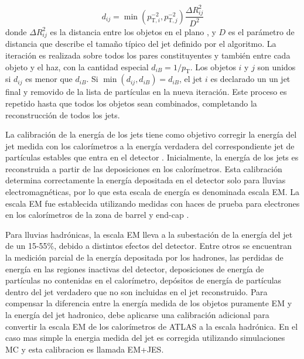 \begin{equation}
  d_{ij} = \min(p_{\mathrm{T},i}^{-2}, p_{\mathrm{T},j}^{-2}) \frac{\Delta R_{ij}^2}{D^2}
\end{equation}
%
donde $\Delta R_{ij}^2$ es la distancia entre los objetos en el plano {\etaphi},
y $D$ es el parámetro de distancia que describe el tamaño típico del jet
definido por el algoritmo. La iteración es realizada sobre todos los pares
constituyentes y también entre cada objeto y el haz, con la cantidad especial
$d_{iB} = 1/p_{\mathrm{T}}$. Los objetos $i$ y $j$ son unidos si $d_{ij}$ es
menor que $d_{iB}$.
Si $\min(d_{ij}, d_{iB}) = d_{iB}$, el jet $i$ es declarado un un jet final y
removido de la lista de partículas en la nueva iteración. Este proceso es
repetido hasta que todos los objetos sean combinados, completando la
reconstrucción de todos los jets.

La calibración de la energía de los jets tiene como objetivo corregir la energía
del jet medida con los calorímetros a la energía verdadera del correspondiente
jet de partículas estables que entra en el detector \cite{Aad:2011he}. Inicialmente, la energía de
los jets es reconstruida a partir de las deposiciones en los calorímetros. Esta
calibración determina correctamente la energía depositada en el detector solo
para lluvias electromagnéticas, por lo que esta escala de energía es denominada escala
EM.
La escala EM fue establecida utilizando medidas con haces de prueba para
electrones en los calorímetros de la zona de barrel
\cite{Abat:1900zz,Aharrouche:2010zz,Adragna:2009zz} y end-cap
\cite{Pinfold:2008zzb,2004NIMPA.531..481C}.

Para lluvias hadrónicas, la escala EM lleva a la subestación de la energía del
jet de un 15-55\%, debido a distintos efectos del detector. Entre otros se
encuentran la medición parcial de la energía depositada por los hadrones, las
perdidas de energía en las regiones inactivas del detector, deposiciones de
energía de partículas no contenidas en el calorímetro, depósitos de energía de
partículas dentro del jet verdadero que no son incluidas en el jet reconstruido.
Para compensar la diferencia entre la energía medida de los objetos puramente EM
y la energía del jet hadronico, debe aplicarse una calibración adicional para
convertir la escala EM de los calorímetros de ATLAS a la escala hadrónica.
En el caso mas simple la energia medida del jet es corregida utilizando
simulaciones MC y esta calibracion es llamada EM+JES.

